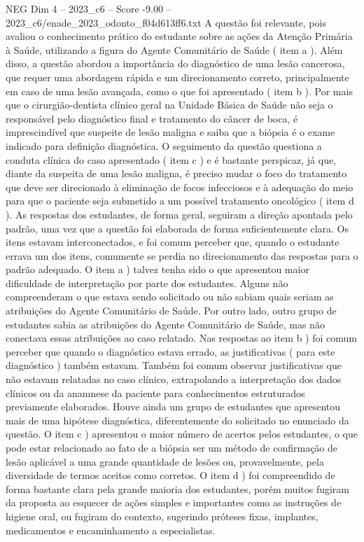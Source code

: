 \begin{textsample}{NEG Dim 4 – 2023\_c6 – Score -9.00 – 2023\_c6/enade\_2023\_odonto\_f04d613ff6.txt}
A questão foi relevante, pois avaliou o conhecimento prático do estudante sobre as ações da Atenção Primária à Saúde, utilizando a figura do Agente Comunitário de Saúde ( item a ).
Além disso, a questão abordou a importância do diagnóstico de uma lesão cancerosa, que requer uma abordagem rápida e um direcionamento correto, principalmente em caso de uma lesão avançada, como o que foi apresentado ( item b ).
Por mais que o cirurgião-dentista clínico geral na Unidade Básica de Saúde não seja o responsável pelo diagnóstico final e tratamento do câncer de boca, é imprescindível que suspeite de lesão maligna e saiba que a biópsia é o exame indicado para definição diagnóstica.
O seguimento da questão questiona a conduta clínica do caso apresentado ( item c ) e é bastante perspicaz, já que, diante da suspeita de uma lesão maligna, é preciso mudar o foco do tratamento que deve ser direcionado à eliminação de focos infecciosos e à adequação do meio para que o paciente seja submetido a um possível tratamento oncológico ( item d ).
As respostas dos estudantes, de forma geral, seguiram a direção apontada pelo padrão, uma vez que a questão foi elaborada de forma suficientemente clara.
Os itens estavam interconectados, e foi comum perceber que, quando o estudante errava um dos itens, comumente se perdia no direcionamento das respostas para o padrão adequado.
O item a ) talvez tenha sido o que apresentou maior dificuldade de interpretação por parte dos estudantes.
Alguns não compreenderam o que estava sendo solicitado ou não sabiam quais seriam as atribuições do Agente Comunitário de Saúde.
Por outro lado, outro grupo de estudantes sabia as atribuições do Agente Comunitário de Saúde, mas não conectava essas atribuições ao caso relatado.
Nas respostas ao item b ) foi comum perceber que quando o diagnóstico estava errado, as justificativas ( para este diagnóstico ) também estavam.
Também foi comum observar justificativas que não estavam relatadas no caso clínico, extrapolando a interpretação dos dados clínicos ou da anamnese da paciente para conhecimentos estruturados previamente elaborados.
Houve ainda um grupo de estudantes que apresentou mais de uma hipótese diagnóstica, diferentemente do solicitado no enunciado da questão.
O item c ) apresentou o maior número de acertos pelos estudantes, o que pode estar relacionado ao fato de a biópsia ser um método de confirmação de lesão aplicável a uma grande quantidade de lesões ou, provavelmente, pela diversidade de termos aceitos como corretos.
O item d ) foi compreendido de forma bastante clara pela grande maioria dos estudantes, porém muitos fugiram da proposta ao esquecer de ações simples e importantes como as instruções de higiene oral, ou fugiram do contexto, sugerindo próteses fixas, implantes, medicamentos e encaminhamento a especialistas.

\end{textsample}
